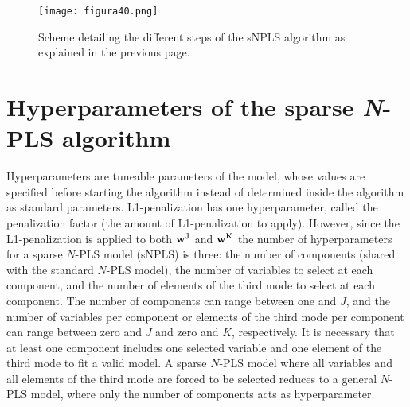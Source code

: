 \begin{figure}[hbtp]
\centering
\texttt{[image: figura40.png]}
\caption[Scheme detailing the different steps of the sNPLS algorithm]{Scheme detailing the different steps of the sNPLS algorithm as explained in the previous page. \vspace{15pt}}
\label{figura40}
\end{figure}



\section{Hyperparameters of the sparse \textit{N}-PLS algorithm}
\label{hyperparameters}
Hyperparameters are tuneable parameters of the model, whose values are specified before starting the algorithm instead of determined inside the algorithm as standard parameters. L1-penalization has one hyperparameter, called the penalization factor (the amount of L1-penalization to apply). However, since the L1-penalization is applied to both $\textbf{\text{w}}^\text{J}$ and $\textbf{\text{w}}^\text{K}$ the number of hyperparameters for a sparse $N$-PLS model (sNPLS) is three: the number of components (shared with the standard $N$-PLS model), the number of variables to select at each component, and the number of elements of the third mode to select at each component. The number of components can range between one and $J$, and the number of variables per component or elements of the third mode per component can range between zero and $J$ and zero and $K$, respectively. It is necessary that at least one component includes one selected variable and one element of the third mode to fit a valid model. A sparse $N$-PLS model where all variables and all elements of the third mode are forced to be selected reduces to a general $N$-PLS model, where only the number of components acts as hyperparameter.

